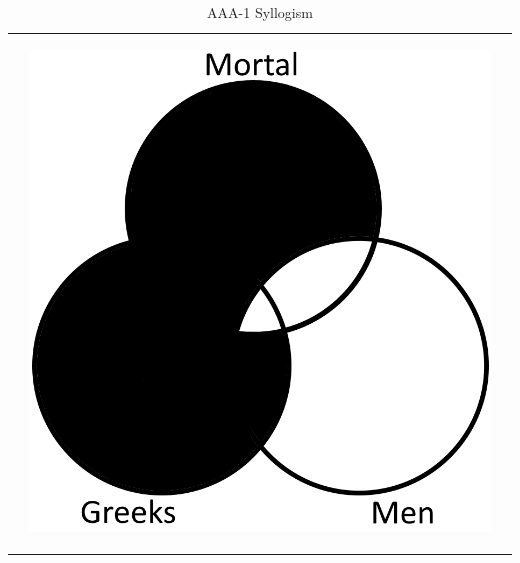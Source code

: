 \documentclass[12pt,a4paper]{report}
\begin{document}
\begin{table}[htb]
\begin{tabular}{>{\raggedright\arraybackslash}m{40mm} m{40mm} m{40mm}}
\begin{minipage}{.29\textwidth}
    \end{minipage}
    & 
    \begin{minipage}{.29\textwidth}
    \begin{center}
      \includegraphics[scale=0.16]{VennAllGreeksAreMortal}
    \end{center}
  
    \end{minipage}
    \\
  \end{tabular}
  \caption{AAA-1 Syllogism}\label{tbl:vennAAA-1}
\end{table}
\FloatBarrier
\end{document}
